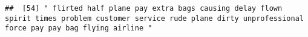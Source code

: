 \documentclass[
]{article}
\begin{document}
\begin{verbatim}
##  [54] " flirted half plane pay extra bags causing delay flown spirit times problem customer service rude plane dirty unprofessional force pay pay bag flying airline "                                                                                                                                                                                                                                                                                                                                                                                                                                                                                                                                                                                                                                                                                                                                                                                                                                                                                                                                                                                                                                                                                                                                                                                                                                                                                                                                                                                                                                                                                                                                                                                                                                

\end{verbatim}
\end{document}

